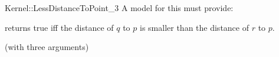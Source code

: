 \begin{ccRefFunctionObjectConcept}{Kernel::LessDistanceToPoint_3}
A model for this must provide:


{returns true iff the distance of $q$ to $p$ is
smaller than the distance of $r$ to $p$.}

\ccRefines
{} (with three arguments)

\ccSeeAlso
{}

\end{ccRefFunctionObjectConcept}
